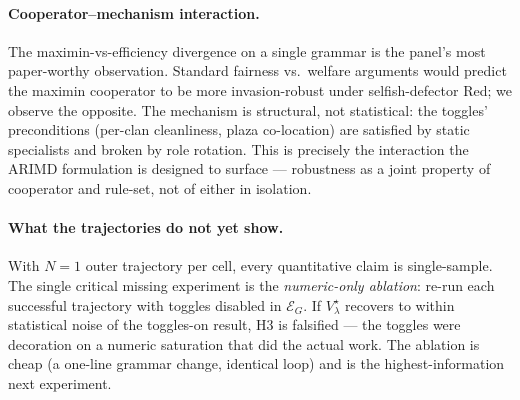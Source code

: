 \documentclass[11pt]{article}
\newcommand{\Egram}{\mathcal{E}_G}
\begin{document}
\paragraph{Cooperator–mechanism interaction.}
The maximin-vs-efficiency divergence on a single grammar is the
panel's most paper-worthy observation.  Standard fairness vs.\
welfare arguments would predict the maximin cooperator to be more
invasion-robust under selfish-defector Red; we observe the
opposite.  The mechanism is structural, not statistical: the
toggles' preconditions (per-clan cleanliness, plaza co-location)
are satisfied by static specialists and broken by role rotation.
This is precisely the interaction the ARIMD formulation is
designed to surface — robustness as a joint property of cooperator
and rule-set, not of either in isolation.

\paragraph{What the trajectories do not yet show.}
With $N = 1$ outer trajectory per cell, every quantitative claim
is single-sample.  The single critical missing experiment is the
\emph{numeric-only ablation}: re-run each successful trajectory
with toggles disabled in $\Egram$.  If $V_\lambda^\star$ recovers
to within statistical noise of the toggles-on result, H3 is
falsified — the toggles were decoration on a numeric saturation
that did the actual work.  The ablation is cheap (a one-line
grammar change, identical loop) and is the highest-information
next experiment.
\end{document}
